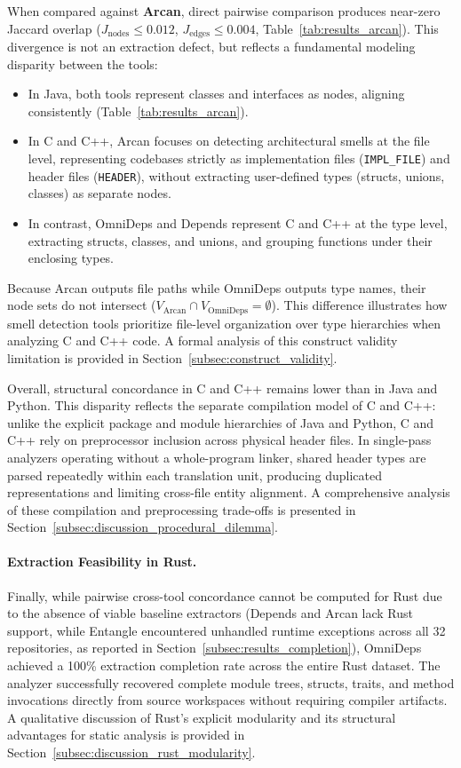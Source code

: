 When compared against \textbf{Arcan}, direct pairwise comparison
produces near-zero Jaccard overlap ($J_{\text{nodes}} \le 0.012$,
$J_{\text{edges}} \le 0.004$, Table~\ref{tab:results_arcan}). This
divergence is not an extraction defect, but reflects a fundamental
modeling disparity between the tools:
\begin{itemize}
  \item In Java, both tools represent classes and interfaces as nodes, aligning
    consistently (Table~\ref{tab:results_arcan}).
  \item In C and C++, Arcan focuses on detecting architectural smells
    at the file
    level, representing codebases strictly as implementation files
    (\texttt{IMPL\_FILE})
    and header files (\texttt{HEADER}), without extracting
    user-defined types (structs,
    unions, classes) as separate nodes.
  \item In contrast, OmniDeps and Depends represent C and C++ at the type level,
    extracting structs, classes, and unions, and grouping functions
    under their enclosing
    types.
\end{itemize}
Because Arcan outputs file paths while OmniDeps outputs type names,
their node sets do not intersect ($V_{\text{Arcan}} \cap
V_{\text{OmniDeps}} = \emptyset$). This difference illustrates how
smell detection tools prioritize file-level organization over type
hierarchies when analyzing C and C++ code. A formal analysis of this
construct validity limitation is provided in
Section~\ref{subsec:construct_validity}.

Overall, structural concordance in C and C++ remains lower than in
Java and Python. This disparity reflects the separate compilation model of
C and C++: unlike the explicit package and module hierarchies of Java
and Python, C and C++ rely on preprocessor inclusion across physical
header files. In single-pass analyzers operating without a
whole-program linker, shared header types are parsed repeatedly
within each translation unit, producing duplicated representations
and limiting cross-file entity alignment. A comprehensive analysis of
these compilation and preprocessing trade-offs is presented in
Section~\ref{subsec:discussion_procedural_dilemma}.

\paragraph{Extraction Feasibility in Rust.}
Finally, while pairwise cross-tool concordance cannot be computed for
Rust due to the absence of viable baseline extractors (Depends and
  Arcan lack Rust support, while Entangle encountered unhandled runtime
  exceptions across all 32 repositories, as reported in
Section~\ref{subsec:results_completion}), OmniDeps achieved a 100\%
extraction completion rate across the entire Rust dataset. The
analyzer successfully recovered complete module trees, structs,
traits, and method invocations directly from source workspaces
without requiring compiler artifacts. A qualitative discussion of
Rust's explicit modularity and its structural advantages for static
analysis is provided in Section~\ref{subsec:discussion_rust_modularity}.

